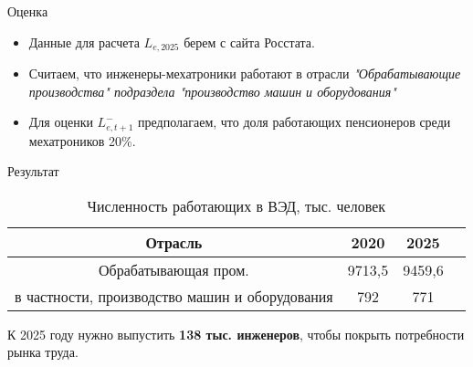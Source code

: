 \begin{frame}{Оценка} 
	\begin{itemize}
		\item Данные для расчета $L_{e, 2025}$ берем с сайта Росстата.
		\item Считаем, что инженеры-мехатроники работают в отрасли \textit{"Обрабатывающие производства" подраздела "производство машин и
		оборудования"}
		\item Для оценки $L_{e, t+1}^{-}$ предполагаем, что доля работающих пенсионеров среди мехатроников 20\%.
	\end{itemize}
\end{frame}

\begin{frame}{Результат} 
		\begin{table}
		\begin{center}
			\caption{Численность работающих в ВЭД, тыс. человек}\label{res}
			\begin{tabular}{ |c|c|c|c| } 
				\hline
				Отрасль                                        & 2020   & 2025 \\
				\hline
				Обрабатывающая пром.                           & 9713,5 & 9459,6 \\
				\hline
				в частности, производство машин и оборудования & 792    & 771 \\
				\hline
			\end{tabular}
		\end{center}
	\end{table}
	К 2025 году нужно выпустить \textbf{138 тыс. инженеров}, чтобы покрыть потребности рынка труда.
\end{frame}